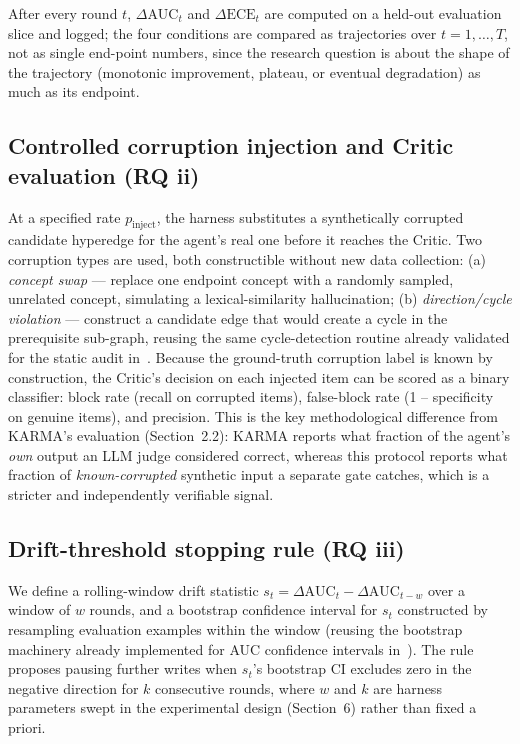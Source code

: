 \documentclass[review,12pt]{elsarticle}
\begin{document}
After every round $t$, $\Delta\text{AUC}_t$ and $\Delta\text{ECE}_t$ are
computed on a held-out evaluation slice and logged; the four conditions
are compared as trajectories over $t = 1, \dots, T$, not as single
end-point numbers, since the research question is about the shape of the
trajectory (monotonic improvement, plateau, or eventual degradation) as
much as its endpoint.

\subsection{Controlled corruption injection and Critic evaluation (RQ ii)}

At a specified rate $p_{\text{inject}}$, the harness substitutes a
synthetically corrupted candidate hyperedge for the agent's real one
before it reaches the Critic. Two corruption types are used, both
constructible without new data collection: (a) \emph{concept
swap} --- replace one endpoint concept with a randomly sampled,
unrelated concept, simulating a lexical-similarity hallucination; (b)
\emph{direction/cycle violation} --- construct a candidate edge that
would create a cycle in the prerequisite sub-graph, reusing the same
cycle-detection routine already validated for the static audit
in~\cite{daominh2026p0}. Because the ground-truth corruption label is
known by construction, the Critic's decision on each injected item can be
scored as a binary classifier: block rate (recall on corrupted items),
false-block rate (1 -- specificity on genuine items), and precision.
This is the key methodological difference from KARMA's evaluation
(Section~2.2): KARMA reports what fraction of the agent's \emph{own}
output an LLM judge considered correct, whereas this protocol reports
what fraction of \emph{known-corrupted} synthetic input a separate gate
catches, which is a stricter and independently verifiable signal.

\subsection{Drift-threshold stopping rule (RQ iii)}

We define a rolling-window drift statistic
$s_t = \Delta\text{AUC}_t - \Delta\text{AUC}_{t-w}$ over a window of $w$
rounds, and a bootstrap confidence interval for $s_t$ constructed by
resampling evaluation examples within the window (reusing the bootstrap
machinery already implemented for AUC confidence intervals
in~\cite{daominh2026p0}). The rule proposes pausing further writes when
$s_t$'s bootstrap CI excludes zero in the negative direction for
$k$ consecutive rounds, where $w$ and $k$ are harness parameters swept
in the experimental design (Section~6) rather than fixed a priori.
\end{document}
